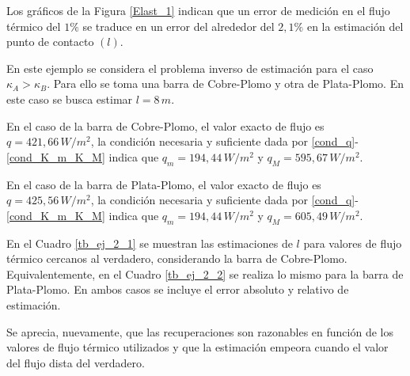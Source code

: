 Los gr\'aficos de la Figura \ref{Elast_1} indican que un error de medici\'on en el flujo t\'ermico del $1 \%$ se traduce en un error del alrededor del $2,1 \%$ en la estimaci\'on del punto de contacto $(l)$. 
%
\begin{exmpl}
\label{ej2_Cap_7}
En este ejemplo se considera el problema inverso de estimaci\'on para el caso $\kappa_A > \kappa_B$. Para ello se toma 
una barra de Cobre-Plomo y otra de Plata-Plomo. En este caso se busca estimar $l=8 \, m $.
\end{exmpl}
%
En el caso de la barra de Cobre-Plomo, el valor exacto de flujo es $q=421,66 \, W/m{^{2}}$, la condici\'on necesaria y suficiente dada por \eqref{cond_q}-\eqref{cond_K_m_K_M} indica que
$q_m=194,44 \, W/m{^{2}}$ y $q_M=595,67 \, W/m{^{2}}$.

En el caso de la barra de Plata-Plomo, el valor exacto de flujo es $q=425,56 \, W/m{^{2}}$, la condici\'on necesaria y suficiente dada por \eqref{cond_q}-\eqref{cond_K_m_K_M} indica que
$q_m=194,44 \, W/m{^{2}}$ y $q_M=605,49 \, W/m{^{2}}$.

En el Cuadro \ref{tb_ej_2_1} se muestran las estimaciones de $l$ para valores de flujo t\'ermico cercanos al verdadero, considerando la barra de Cobre-Plomo. 
Equivalentemente, en el Cuadro \ref{tb_ej_2_2} se realiza lo mismo para la barra de Plata-Plomo. En ambos casos se incluye el error absoluto y relativo de estimaci\'on.

Se aprecia, nuevamente, que las recuperaciones son razonables en funci\'on de los valores de flujo t\'ermico utilizados y que la estimaci\'on empeora cuando el valor del flujo dista del verdadero.

